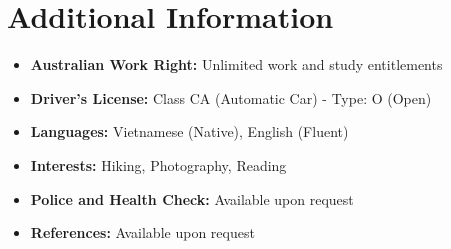 \documentclass[a4paper,12pt]{article}
\begin{document}
\section*{Additional Information}
\begin{itemize}
    \item \textbf{Australian Work Right:} Unlimited work and study entitlements
    \item \textbf{Driver's License:} Class CA (Automatic Car) - Type: O (Open)
    \item \textbf{Languages:} Vietnamese (Native), English (Fluent)
    \item \textbf{Interests:} Hiking, Photography, Reading
    \item \textbf{Police and Health Check:} Available upon request
    \item \textbf{References:} Available upon request
\end{itemize}
\end{document}
